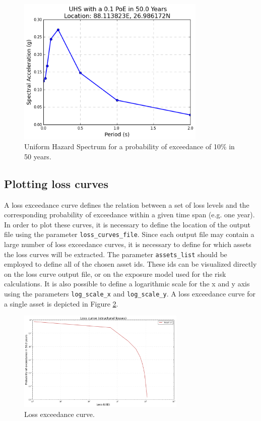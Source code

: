 \begin{figure}[htb]
  \centering
      \includegraphics[width=9cm]{figures/UHS.png}
  \caption{Uniform Hazard Spectrum for a probability of exceedance of 10\% in 50 years.}
  \label{fig:UHS}
\end{figure}

\subsection{Plotting loss curves}
\label{subsec:plot-loss_curves}
A loss exceedance curve defines the relation between a set of loss levels and the corresponding probability of exceedance within a given time span (e.g. one year). In order to plot these curves, it is necessary to define the location of the output file using the parameter \verb=loss_curves_file=. Since each output file may contain a large number of loss exceedance curves, it is necessary to define for which assets the loss curves will be extracted. The parameter \verb=assets_list= should be employed to define all of the chosen asset ids. These ids can be visualized directly on the loss curve output file, or on the exposure model used for the risk calculations. It is also possible to define a logarithmic scale for the x and y axis using the parameters \verb=log_scale_x= and \verb=log_scale_y=. A loss exceedance curve for a single asset is depicted in Figure \ref{fig:loss_curve}.

\begin{figure}[htb]
  \centering
      \includegraphics[width=8cm]{figures/loss_curve.png}
  \caption{Loss exceedance curve.}
  \label{fig:loss_curve}
\end{figure}